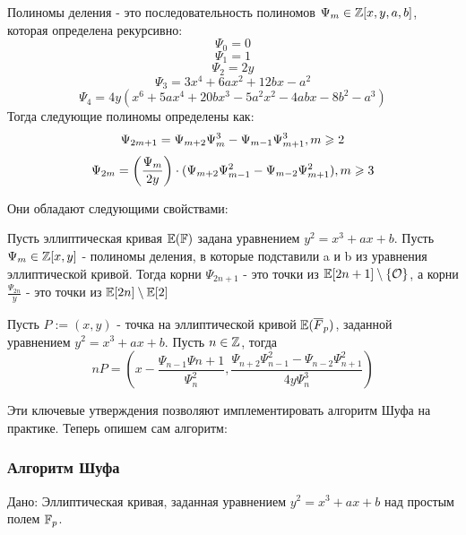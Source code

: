 \documentclass{article}
\begin{document}
    \begin{definition}
      Полиномы деления - это последовательность полиномов $\Psi_m\in\mathbb{Z}[x,y,a,b]$, которая определена рекурсивно:
      \[\Psi_0 = 0\]
      \[\Psi_1 = 1\]
      \[\Psi_2 = 2y\]
      \[\Psi_3 = 3x^4+6ax^2+12bx-a^2\]
      \[\Psi_4 = 4y(x^6 + 5ax^4+20bx^3-5a^2x^2-4abx-8b^2-a^3)\]
      Тогда следующие полиномы определены как:
      \[\Psi_{2m+1} = \Psi_{m+2}\Psi_m^3 - \Psi_{m-1}\Psi_{m+1}^3,\q m\geqslant 2\]
      \[\Psi_{2m} = \left(\frac{\Psi_m}{2y}\right)\cdot (\Psi_{m+2}\Psi_{m-1}^2 - \Psi_{m-2}\Psi_{m+1}^2),\q m\geqslant 3\]
    \end{definition}

    Они обладают следующими свойствами:
    \begin{claim}
      Пусть эллиптическая кривая $\mathbb{E}(\mathbb{F})$ задана уравнением $y^2 = x^3+ax+b$. Пусть $\Psi_m\in\mathbb{Z}[x,y]$ - полиномы деления, в которые подставили a и b из уравнения эллиптической кривой. Тогда корни $\Psi_{2n+1}$ - это точки из $\mathbb{E}[2n+1]\setminus \left\{\mathcal{O}\right\}$, а корни $\frac{\Psi_{2n}}{y}$ - это точки из $\mathbb{E}[2n]\setminus \mathbb{E}[2]$
    \end{claim}
    \begin{claim}
      Пусть $P:=(x,y)$ - точка на эллиптической кривой $\mathbb{E}(\overline{F}_p)$, заданной уравнением $y^2 = x^3+ax+b$. Пусть $n\in \mathbb{Z}$, тогда
      \[nP = \left(x - \frac{\Psi_{n-1}\Psi{n+1}}{\Psi_n^2}, \frac{\Psi_{n+2}\Psi_{n-1}^2-\Psi_{n-2}\Psi_{n+1}^2}{4y\Psi_n^3}\right)\]
    \end{claim}
    Эти ключевые утверждения позволяют имплементировать алгоритм Шуфа на практике. Теперь опишем сам алгоритм:

   \subsubsection{Алгоритм Шуфа}
    Дано: Эллиптическая кривая, заданная уравнением $y^2=x^3+ax+b$ над простым полем $\mathbb{F}_p$.
\end{document}
